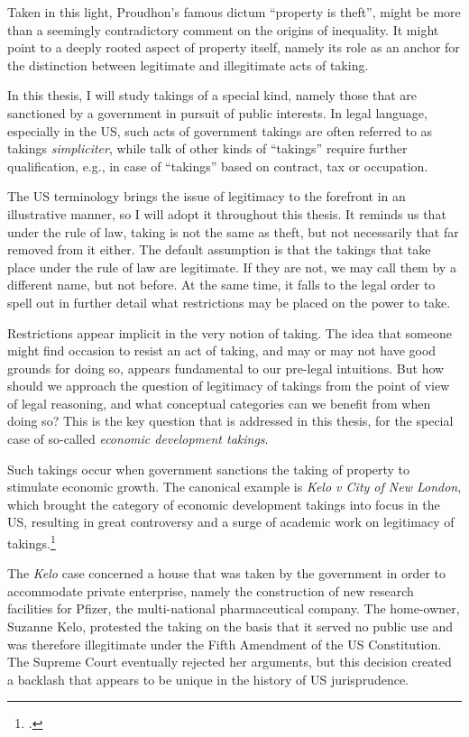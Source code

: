 Taken in this light, Proudhon's famous dictum ``property is theft'', might be more than a seemingly contradictory comment on the origins of inequality. It might point to a deeply rooted aspect of property itself, namely its role as an anchor for the distinction between legitimate and illegitimate acts of taking. %

In this thesis, I will study takings of a special kind, namely those that are sanctioned by a government in pursuit of public interests. In legal language, especially in the US, such acts of government takings are often referred to as takings {\it simpliciter}, while talk of other kinds of ``takings'' require further qualification, e.g., in case of ``takings'' based on contract, tax or occupation.

The US terminology brings the issue of legitimacy to the forefront in an illustrative manner, so I will adopt it throughout this thesis. It reminds us that under the rule of law, taking is not the same as theft, but not necessarily that far removed from it either. The default assumption is that the takings that take place under the rule of law are legitimate. If they are not, we may call them by a different name, but not before. At the same time, it falls to the legal order to spell out in further detail what restrictions may be placed on the power to take. 

Restrictions appear implicit in the very notion of taking. The idea that someone might find occasion to resist an act of taking, and may or may not have good grounds for doing so, appears fundamental to our pre-legal intuitions. But how should we approach the question of legitimacy of takings from the point of view of legal reasoning, and what conceptual categories can we benefit from when doing so? This is the key question that is addressed in this thesis, for the special case of so-called {\it economic development takings}.

Such takings occur when government sanctions the taking of property to stimulate economic growth. The canonical example is {\it Kelo v City of New London}, which brought the category of economic development takings into focus in the US, resulting in great controversy and a surge of academic work on legitimacy of takings.\footcite{kelo05} 

The {\it Kelo} case concerned a house that was taken by the government in order to accommodate private enterprise, namely the construction of new research facilities for Pfizer, the multi-national pharmaceutical company. The home-owner, Suzanne Kelo, protested the taking on the basis that it served no public use and was therefore illegitimate under the Fifth Amendment of the US Constitution. The Supreme Court eventually rejected her arguments, but this decision created a backlash that appears to be unique in the history of US jurisprudence. 

